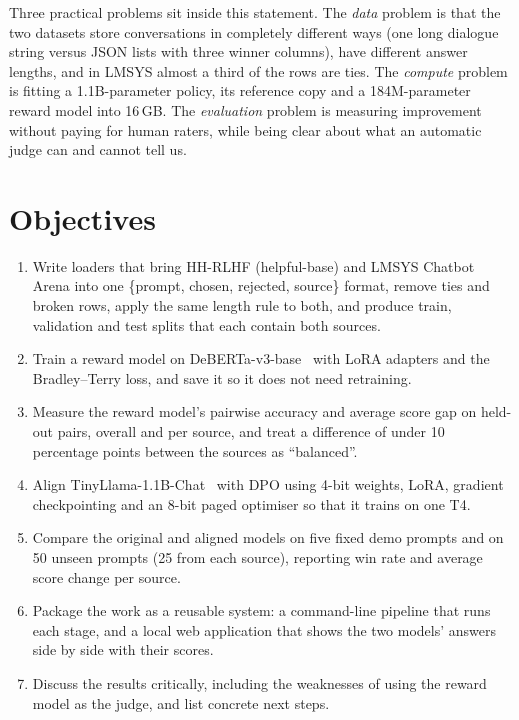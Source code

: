 Three practical problems sit inside this statement. The \emph{data} problem is that the two datasets store conversations in completely different ways (one long dialogue string versus JSON lists with three winner columns), have different answer lengths, and in LMSYS almost a third of the rows are ties. The \emph{compute} problem is fitting a 1.1B-parameter policy, its reference copy and a 184M-parameter reward model into 16\,GB. The \emph{evaluation} problem is measuring improvement without paying for human raters, while being clear about what an automatic judge can and cannot tell us.

\section{Objectives}
\label{sec:objectives}

\begin{enumerate}[label=\textbf{O\arabic*.}]
  \item Write loaders that bring HH-RLHF (helpful-base) and LMSYS Chatbot Arena into one \{prompt, chosen, rejected, source\} format, remove ties and broken rows, apply the same length rule to both, and produce train, validation and test splits that each contain both sources.
  \item Train a reward model on DeBERTa-v3-base~\cite{he2023debertav3} with LoRA adapters and the Bradley--Terry loss, and save it so it does not need retraining.
  \item Measure the reward model's pairwise accuracy and average score gap on held-out pairs, overall and per source, and treat a difference of under 10 percentage points between the sources as ``balanced''.
  \item Align TinyLlama-1.1B-Chat~\cite{zhang2024tinyllama} with DPO using 4-bit weights, LoRA, gradient checkpointing and an 8-bit paged optimiser so that it trains on one T4.
  \item Compare the original and aligned models on five fixed demo prompts and on 50 unseen prompts (25 from each source), reporting win rate and average score change per source.
  \item Package the work as a reusable system: a command-line pipeline that runs each stage, and a local web application that shows the two models' answers side by side with their scores.
  \item Discuss the results critically, including the weaknesses of using the reward model as the judge, and list concrete next steps.
\end{enumerate}

